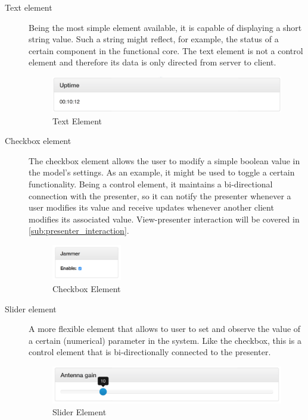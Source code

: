 \documentclass[a4paper, openany, oneside]{memoir}
\begin{document}
\begin{description}
	\item[Text element]
	Being the most simple element available, it is capable of displaying a short string value. Such a string might reflect, for example, the status of a certain component in the functional core. The text element is not a control element and therefore its data is only directed from server to client.

\begin{figure}[H]
    \centering
    \includegraphics[width=\textwidth]{text.png}
    \caption{Text Element}
    \label{fig:text_element}
\end{figure}

	\item[Checkbox element]
	The checkbox element allows the user to modify a simple boolean value in the model's settings. As an example, it might be used to toggle a certain functionality. Being a control element, it maintains a bi-directional connection with the presenter, so it can notify the presenter whenever a user modifies its value and receive updates whenever another client modifies its associated value. View-presenter interaction will be covered in \cref{sub:presenter_interaction}.

\begin{figure}[H]
  \centering
    \includegraphics[width=0.3\textwidth]{checkbox.png}
    \caption{Checkbox Element}
    \label{fig:checkbox_element}
\end{figure}

	\item[Slider element]
	A more flexible element that allows to user to set and observe the value of a certain (numerical) parameter in the system. Like the checkbox, this is a control element that is bi-directionally connected to the presenter.

\begin{figure}[H]
    \centering
    \includegraphics[width=\textwidth]{slider.png}
    \caption{Slider Element}
    \label{fig:slider_element}
\end{figure}


\end{description}
\end{document}
